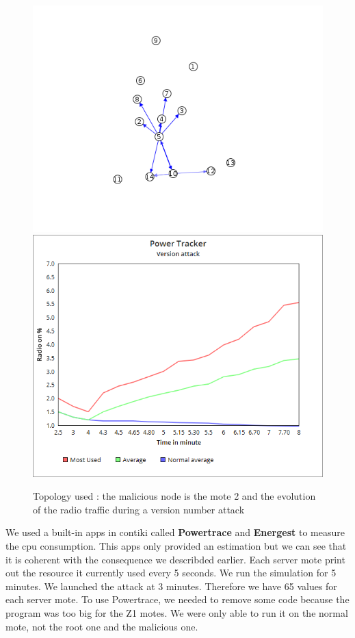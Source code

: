 \documentclass{report}
\begin{document}
\begin{figure}
\includegraphics[scale=0.4]{img/versionStat2}
\includegraphics[scale=0.4]{img/versionStat}
\caption{Topology used : the malicious node is the mote 2 and the evolution of the radio traffic during a version number attack}
\end{figure}


We used a built-in apps in contiki called \textbf{Powertrace} and \textbf{Energest} to measure the cpu 
consumption. This apps only provided an estimation but we can see that it is coherent with the
consequence we describded earlier. Each server mote print out the resource it currently used 
every 5 seconds. We run the simulation for 5 minutes. We launched the attack at 3 minutes.
Therefore we have 65 values for each server mote. To use Powertrace, we needed to remove
some code because the program was too big for the Z1 motes. We were only able to run it
on the normal mote, not the root one and the malicious one. 
\end{document}
